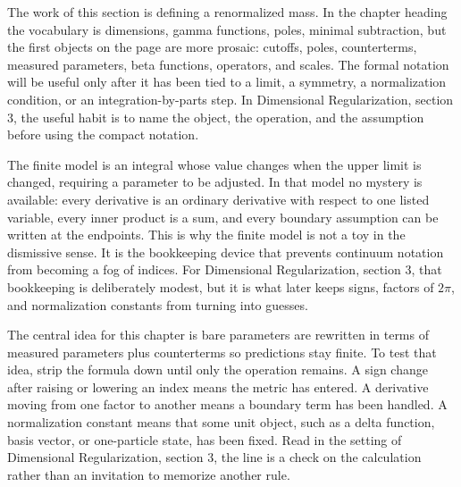 











The work of this section is defining a renormalized mass.  In the chapter heading the vocabulary is dimensions, gamma functions, poles, minimal subtraction, but the first objects on the page are more prosaic: cutoffs, poles, counterterms, measured parameters, beta functions, operators, and scales.  The formal notation will be useful only after it has been tied to a limit, a symmetry, a normalization condition, or an integration-by-parts step.  In Dimensional Regularization, section 3, the useful habit is to name the object, the operation, and the assumption before using the compact notation.

The finite model is an integral whose value changes when the upper limit is changed, requiring a parameter to be adjusted.  In that model no mystery is available: every derivative is an ordinary derivative with respect to one listed variable, every inner product is a sum, and every boundary assumption can be written at the endpoints.  This is why the finite model is not a toy in the dismissive sense.  It is the bookkeeping device that prevents continuum notation from becoming a fog of indices.  For Dimensional Regularization, section 3, that bookkeeping is deliberately modest, but it is what later keeps signs, factors of \(2\pi\), and normalization constants from turning into guesses.

The central idea for this chapter is bare parameters are rewritten in terms of measured parameters plus counterterms so predictions stay finite.  To test that idea, strip the formula down until only the operation remains.  A sign change after raising or lowering an index means the metric has entered.  A derivative moving from one factor to another means a boundary term has been handled.  A normalization constant means that some unit object, such as a delta function, basis vector, or one-particle state, has been fixed.  Read in the setting of Dimensional Regularization, section 3, the line is a check on the calculation rather than an invitation to memorize another rule.

